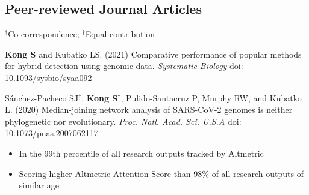 \documentclass[11pt]{article}
\begin{document}
\subsection*{Peer-reviewed Journal Articles}
$^\ddag$Co-correspondence; $^\dag$Equal contribution
\begin{etaremune}

\item \textbf{Kong S} and Kubatko LS. (2021) Comparative performance of popular methods for hybrid detection using genomic data. \textit {Systematic Biology} doi: \href{10.1093/sysbio/syaa092}10.1093/sysbio/syaa092

\item  Sánchez-Pacheco SJ{$^\ddag$}, \textbf{Kong S}{$^\ddag$}, Pulido-Santacruz P, Murphy RW, and Kubatko L. (2020) Median-joining network analysis of SARS-CoV-2 genomes is neither phylogenetic nor evolutionary. \textit{Proc. Natl. Acad. Sci. U.S.A} doi: \href{https://doi.org/10.1073/pnas.2007062117}10.1073/pnas.2007062117
	
	\begin{itemize}\item In the 99th percentile of all research outputs tracked by Altmetric
				\item Scoring higher Altmetric Attention Score than 98\% of all research outputs of similar age \end{itemize}
	

\end{etaremune}
\end{document}

